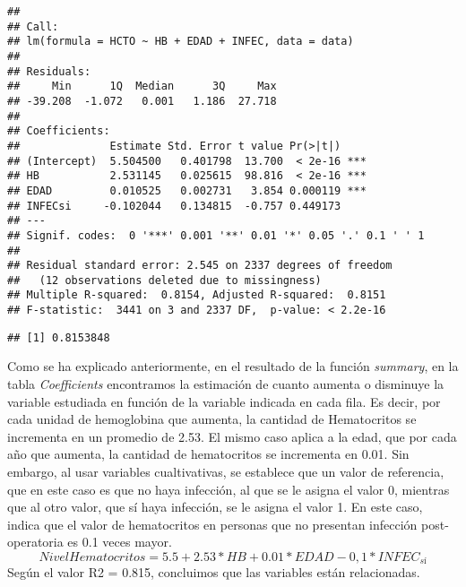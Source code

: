 \documentclass[]{article}
\newenvironment{Shaded}{\begin{snugshade}}{\end{snugshade}}
\newcommand{\DecValTok}[1]{\textcolor[rgb]{0.00,0.00,0.81}{#1}}
\newcommand{\KeywordTok}[1]{\textcolor[rgb]{0.13,0.29,0.53}{\textbf{#1}}}
\newcommand{\NormalTok}[1]{#1}
\newcommand{\OperatorTok}[1]{\textcolor[rgb]{0.81,0.36,0.00}{\textbf{#1}}}
\newcommand{\StringTok}[1]{\textcolor[rgb]{0.31,0.60,0.02}{#1}}
\begin{document}
\begin{verbatim}
## 
## Call:
## lm(formula = HCTO ~ HB + EDAD + INFEC, data = data)
## 
## Residuals:
##     Min      1Q  Median      3Q     Max 
## -39.208  -1.072   0.001   1.186  27.718 
## 
## Coefficients:
##              Estimate Std. Error t value Pr(>|t|)    
## (Intercept)  5.504500   0.401798  13.700  < 2e-16 ***
## HB           2.531145   0.025615  98.816  < 2e-16 ***
## EDAD         0.010525   0.002731   3.854 0.000119 ***
## INFECsi     -0.102044   0.134815  -0.757 0.449173    
## ---
## Signif. codes:  0 '***' 0.001 '**' 0.01 '*' 0.05 '.' 0.1 ' ' 1
## 
## Residual standard error: 2.545 on 2337 degrees of freedom
##   (12 observations deleted due to missingness)
## Multiple R-squared:  0.8154, Adjusted R-squared:  0.8151 
## F-statistic:  3441 on 3 and 2337 DF,  p-value: < 2.2e-16
\end{verbatim}

\begin{Shaded}
\end{Shaded}

\begin{verbatim}
## [1] 0.8153848
\end{verbatim}

Como se ha explicado anteriormente, en el resultado de la función
\emph{summary}, en la tabla \emph{Coefficients} encontramos la
estimación de cuanto aumenta o disminuye la variable estudiada en
función de la variable indicada en cada fila. Es decir, por cada unidad
de hemoglobina que aumenta, la cantidad de Hematocritos se incrementa en
un promedio de 2.53. El mismo caso aplica a la edad, que por cada año
que aumenta, la cantidad de hematocritos se incrementa en 0.01. Sin
embargo, al usar variables cualtivativas, se establece que un valor de
referencia, que en este caso es que no haya infección, al que se le
asigna el valor 0, mientras que al otro valor, que sí haya infección, se
le asigna el valor 1. En este caso, indica que el valor de hematocritos
en personas que no presentan infección post-operatoria es 0.1 veces
mayor.
\[NivelHematocritos = 5.5 + 2.53*HB + 0.01*EDAD - 0,1*INFEC_{sí}\] Según
el valor R2 = 0.815, concluimos que las variables están relacionadas.
\end{document}
